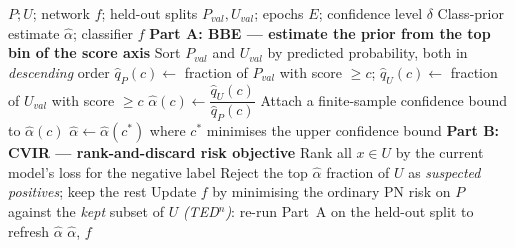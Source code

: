 \documentclass{article}
\begin{document}
\begin{algorithm}[!h]
\renewcommand{\algorithmicrequire}{\textbf{Input:}} %
\renewcommand{\algorithmicensure}{\textbf{Output:}} %
	\caption{BBE (Best Bin Estimation) and CVIR; alternating as TED$^{n}$} %
	\begin{algorithmic}[1] %
	    \REQUIRE
	    $P;U$; network $f$; held-out splits $P_{val},U_{val}$; epochs $E$;
	    confidence level $\delta$
	    \ENSURE
	    Class-prior estimate $\hat{\alpha}$; classifier $f$
	    \STATE \textbf{Part A: BBE --- estimate the prior from the top bin of the score axis}
	    \STATE Sort $P_{val}$ and $U_{val}$ by predicted probability, both in \emph{descending} order %
	    \STATE $\hat{q}_{P}(c)\leftarrow$ fraction of $P_{val}$ with score $\geq c$;\quad
	    $\hat{q}_{U}(c)\leftarrow$ fraction of $U_{val}$ with score $\geq c$
	    \STATE $\hat{\alpha}(c)\leftarrow \dfrac{\hat{q}_{U}(c)}{\hat{q}_{P}(c)}$ %
	    \STATE Attach a finite-sample confidence bound to $\hat{\alpha}(c)$ %
	    \ENDFOR
	    \STATE $\hat{\alpha}\leftarrow \hat{\alpha}(c^{\ast})$ where $c^{\ast}$ minimises the upper confidence bound %
	    \STATE \textbf{Part B: CVIR --- rank-and-discard risk objective}
	    \STATE Rank all $x\in U$ by the current model's loss for the negative label
	    \STATE Reject the top $\hat{\alpha}$ fraction of $U$ as \emph{suspected positives};
	    keep the rest %
	    \STATE Update $f$ by minimising the ordinary PN risk on $P$ against the \emph{kept} subset of $U$
	    \STATE \emph{(TED$^{n}$)}: re-run Part~A on the held-out split to refresh $\hat{\alpha}$ %
	    \ENDFOR
		\RETURN $\hat{\alpha}$, $f$
	\end{algorithmic}
\end{algorithm}
\end{document}

